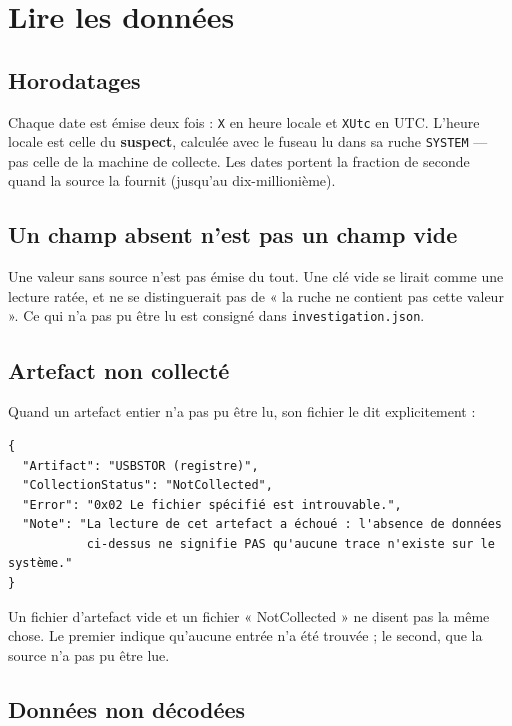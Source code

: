 \documentclass[11pt,a4paper,oneside]{report}
\newcommand{\champ}[1]{\texttt{#1}}
\newcommand{\fichier}[1]{\texttt{#1}}
\begin{document}
\chapter{Lire les données}\label{chap:lecture}

\section{Horodatages}

Chaque date est émise deux fois : \champ{X} en heure locale et \champ{XUtc} en
UTC. L'heure locale est celle du \textbf{suspect}, calculée avec le fuseau lu
dans sa ruche \fichier{SYSTEM} — pas celle de la machine de collecte. Les dates
portent la fraction de seconde quand la source la fournit (jusqu'au
dix-millionième).

\section{Un champ absent n'est pas un champ vide}

Une valeur sans source n'est pas émise du tout. Une clé vide se lirait comme une
lecture ratée, et ne se distinguerait pas de « la ruche ne contient pas cette
valeur ». Ce qui n'a pas pu être lu est consigné dans
\fichier{investigation.json}.

\section{Artefact non collecté}

Quand un artefact entier n'a pas pu être lu, son fichier le dit explicitement :

\begin{lstlisting}
{
  "Artifact": "USBSTOR (registre)",
  "CollectionStatus": "NotCollected",
  "Error": "0x02 Le fichier spécifié est introuvable.",
  "Note": "La lecture de cet artefact a échoué : l'absence de données
           ci-dessus ne signifie PAS qu'aucune trace n'existe sur le système."
}
\end{lstlisting}

\begin{attention}
Un fichier d'artefact vide et un fichier « NotCollected » ne disent pas la même
chose. Le premier indique qu'aucune entrée n'a été trouvée ; le second, que
la source n'a pas pu être lue.
\end{attention}

\section{Données non décodées}
\end{document}
